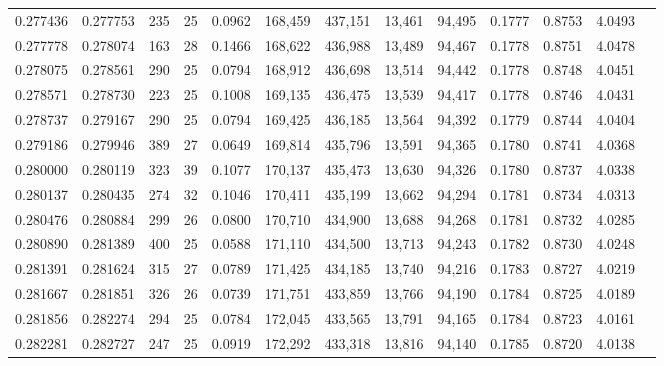 \begin{tabular}{rrrrrrrrrrrrr}
0.277436 & 0.277753 &    235 &    25 &                                     0.0962 & 168,459 & 437,151 &  13,461 &  94,495 & 0.1777 & 0.8753 & 4.0493 \\
0.277778 & 0.278074 &    163 &    28 &                                     0.1466 & 168,622 & 436,988 &  13,489 &  94,467 & 0.1778 & 0.8751 & 4.0478 \\
0.278075 & 0.278561 &    290 &    25 &                                     0.0794 & 168,912 & 436,698 &  13,514 &  94,442 & 0.1778 & 0.8748 & 4.0451 \\
0.278571 & 0.278730 &    223 &    25 &                                     0.1008 & 169,135 & 436,475 &  13,539 &  94,417 & 0.1778 & 0.8746 & 4.0431 \\
0.278737 & 0.279167 &    290 &    25 &                                     0.0794 & 169,425 & 436,185 &  13,564 &  94,392 & 0.1779 & 0.8744 & 4.0404 \\
0.279186 & 0.279946 &    389 &    27 &                                     0.0649 & 169,814 & 435,796 &  13,591 &  94,365 & 0.1780 & 0.8741 & 4.0368 \\
0.280000 & 0.280119 &    323 &    39 &                                     0.1077 & 170,137 & 435,473 &  13,630 &  94,326 & 0.1780 & 0.8737 & 4.0338 \\
0.280137 & 0.280435 &    274 &    32 &                                     0.1046 & 170,411 & 435,199 &  13,662 &  94,294 & 0.1781 & 0.8734 & 4.0313 \\
0.280476 & 0.280884 &    299 &    26 &                                     0.0800 & 170,710 & 434,900 &  13,688 &  94,268 & 0.1781 & 0.8732 & 4.0285 \\
0.280890 & 0.281389 &    400 &    25 &                                     0.0588 & 171,110 & 434,500 &  13,713 &  94,243 & 0.1782 & 0.8730 & 4.0248 \\
0.281391 & 0.281624 &    315 &    27 &                                     0.0789 & 171,425 & 434,185 &  13,740 &  94,216 & 0.1783 & 0.8727 & 4.0219 \\
0.281667 & 0.281851 &    326 &    26 &                                     0.0739 & 171,751 & 433,859 &  13,766 &  94,190 & 0.1784 & 0.8725 & 4.0189 \\
0.281856 & 0.282274 &    294 &    25 &                                     0.0784 & 172,045 & 433,565 &  13,791 &  94,165 & 0.1784 & 0.8723 & 4.0161 \\
0.282281 & 0.282727 &    247 &    25 &                                     0.0919 & 172,292 & 433,318 &  13,816 &  94,140 & 0.1785 & 0.8720 & 4.0138 \\

\end{tabular}
